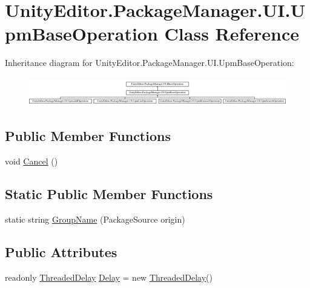 \hypertarget{class_unity_editor_1_1_package_manager_1_1_u_i_1_1_upm_base_operation}{}\section{Unity\+Editor.\+Package\+Manager.\+U\+I.\+Upm\+Base\+Operation Class Reference}
\label{class_unity_editor_1_1_package_manager_1_1_u_i_1_1_upm_base_operation}
Inheritance diagram for Unity\+Editor.\+Package\+Manager.\+U\+I.\+Upm\+Base\+Operation\+:\begin{figure}[H]
\begin{center}
\leavevmode
\includegraphics[height=1.276596cm]{class_unity_editor_1_1_package_manager_1_1_u_i_1_1_upm_base_operation}
\end{center}
\end{figure}
\subsection*{Public Member Functions}
\begin{DoxyCompactItemize}
\item 
void \mbox{\hyperlink{class_unity_editor_1_1_package_manager_1_1_u_i_1_1_upm_base_operation_a4e52e6586c22b12c9b25f905f6fd2a25}{Cancel}} ()
\end{DoxyCompactItemize}
\subsection*{Static Public Member Functions}
\begin{DoxyCompactItemize}
\item 
static string \mbox{\hyperlink{class_unity_editor_1_1_package_manager_1_1_u_i_1_1_upm_base_operation_ac210057da378964fb9b69ddf919909c0}{Group\+Name}} (Package\+Source origin)
\end{DoxyCompactItemize}
\subsection*{Public Attributes}
\begin{DoxyCompactItemize}
\item 
readonly \mbox{\hyperlink{class_unity_editor_1_1_package_manager_1_1_u_i_1_1_threaded_delay}{Threaded\+Delay}} \mbox{\hyperlink{class_unity_editor_1_1_package_manager_1_1_u_i_1_1_upm_base_operation_aa5c5c1e083dbdc2a6ba63e444d0266ad}{Delay}} = new \mbox{\hyperlink{class_unity_editor_1_1_package_manager_1_1_u_i_1_1_threaded_delay}{Threaded\+Delay}}()
\end{DoxyCompactItemize}
